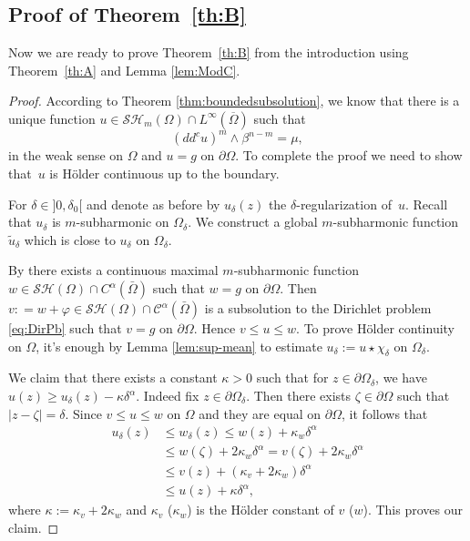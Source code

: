 \documentclass[JEP,XML,SOM,Unicode]{cedram}
\theoremstyle{definition}
\newcommand{\Cc}{\mathcal{C}}
\begin{document}
\subsection{Proof of Theorem~\ref{th:B}}

Now we are ready to prove Theorem~\ref{th:B} from the introduction using Theorem~\ref{th:A} and Lemma \ref{lem:ModC}.

\begin{proof} According to Theorem \ref{thm:boundedsubsolution}, we know that there is a unique function $u\in \mathcal{SH}_m(\Omega)\cap L^{\infty}(\overline{\Omega}) $ such that
\[
(dd^c u)^m\wedge\beta^{n-m}=\mu,
\]
in the weak sense on $\Omega$ and $ u=g $ on $\partial\Omega$. To complete the proof we need to show that~$u$ is Hölder continuous up to the boundary.

For $\delta\in{}]0,\delta_0[$ and denote as before by $u_{\delta}(z)$ the $\delta$-regularization of~$u$. Recall that ${u}_{\delta}$ is $m$-subharmonic on $\Omega_\delta$. We construct a global $m$-subharmonic function $\tilde{u}_{\delta}$ which is close to ${u}_{\delta}$ on $\Omega_\delta$.

By \cite{Ch16} there exists a continuous maximal $m$-subharmonic function $w \in \mathcal{SH} (\Omega) \cap C^{\alpha} (\bar \Omega)$ such that $w = g$ on $\partial \Omega$. Then $v: = w + \varphi \in \mathcal{SH} (\Omega) \cap \Cc^{\alpha} (\bar \Omega)$ is a subsolution to the Dirichlet problem \eqref{eq:DirPb} such that $v = g$ on $\partial \Omega$. Hence $v \leq u \leq w$. To prove Hölder continuity on $\Omega$, it's enough by Lemma \ref{lem:sup-mean} to estimate $u_\delta:= u \star \chi_\delta$
on $\Omega_\delta$.

We claim that there exists a constant $\kappa > 0$ such that for $z\in\partial\Omega_{\delta}$, we have $ u (z) \geq {u}_{\delta}(z) - \kappa \delta^{\alpha} $. Indeed fix $z\in\partial\Omega_{\delta}$. Then there exists $\zeta \in \partial \Omega$ such that $\vert z -\zeta \vert = \delta$. Since $v \leq u \leq w$ on $\Omega$ and they are equal on $\partial \Omega$, it follows that
\begin{align*}
u_{\delta} (z) & \leq w_\delta (z) \leq w (z) + \kappa_w \delta^\alpha \\
& \leq w (\zeta) + 2 \kappa_w \delta^\alpha = v (\zeta) + 2 \kappa_w \delta^\alpha \\
& \leq v (z) +( \kappa_v + 2 \kappa_w) \delta^\alpha \\
& \leq u (z) + \kappa \delta^\alpha,
\end{align*}
where $\kappa:= \kappa_v + 2 \kappa_w$ and $ \kappa_v$ (\resp $\kappa_w$) is the Hölder constant of $v$ (\resp $w$). This proves our claim.


\end{proof}
\end{document}

